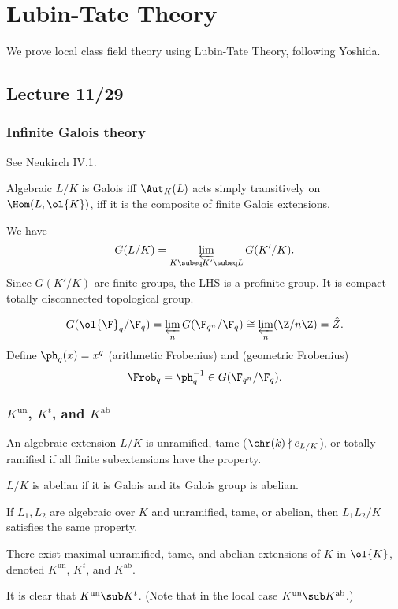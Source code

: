 \chapter{Lubin-Tate Theory}
We prove local class field theory using Lubin-Tate Theory, following Yoshida.

\section{Lecture 11/29}
\subsection{Infinite Galois theory}
See Neukirch IV.1.
\begin{df}
Algebraic $L/K$ is Galois iff $\Aut_K(L)$ acts simply transitively on $\Hom(L,\ol{K})$, iff it is the composite of finite Galois extensions.
\end{df}
We have
\[
G(L/K)=\varprojlim_{K\subeq K'\subeq L} G(K'/K).
\]
Since $G(K'/K)$ are finite groups, the LHS is a profinite group. It is compact totally disconnected topological group.
\begin{ex}
\[
G(\ol{\F}_q/\F_q)=\varprojlim_n G(\F_{q^n}/\F_q) \cong \varprojlim_n(\Z/n\Z)=\hat{Z}.
\]
Define $\ph_q(x)=x^q$ (arithmetic Frobenius) and (geometric Frobenius)
\[
\Frob_q=\ph_q^{-1}\in G(\F_{q^n}/\F_q).
\]
\end{ex}
\subsection{$K^{\text{un}}$, $K^t$, and $K^{\text{ab}}$}
\begin{df}
An algebraic extension $L/K$ is unramified, tame ($\chr(k)\nmid e_{L/K}$), or totally ramified if all finite subextensions have the property.

$L/K$ is abelian if it is Galois and its Galois group is abelian.
\end{df}
\begin{lem}
If $L_1,L_2$ are algebraic over $K$ and unramified, tame, or abelian, then $L_1L_2/K$ satisfies the same property.
\end{lem}
\begin{cor}
There exist maximal unramified, tame, and abelian extensions of $K$ in $\ol{K}$, denoted $K^{\text{un}}$, $K^t$, and $K^{\text{ab}}$.
\end{cor}
It is clear that $K^{\text{un}}\sub K^{t}$. (Note that in the local case $K^{\text{un}}\sub K^{\text{ab}}$.)

